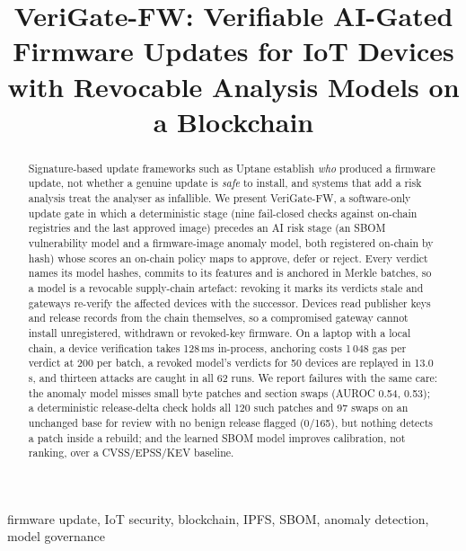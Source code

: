 \documentclass[conference]{IEEEtran}
\newcommand{\sys}{VeriGate-FW}
\begin{document}
\title{\sys: Verifiable AI-Gated Firmware Updates for IoT Devices\\ with Revocable Analysis Models on a Blockchain}

\author{
}

\maketitle

\begin{abstract}
Signature-based update frameworks such as Uptane establish \emph{who} produced a firmware update,
not whether a genuine update is \emph{safe} to install, and systems that add a risk analysis
treat the analyser as infallible. We present \sys{}, a software-only update gate in which a
deterministic stage (nine fail-closed checks against on-chain registries and the last approved
image) precedes an AI risk stage (an SBOM vulnerability model and a firmware-image anomaly model,
both registered on-chain by hash) whose scores an on-chain policy maps to approve, defer or
reject. Every verdict names its model hashes, commits to its features and is anchored in Merkle
batches, so a model is a revocable supply-chain artefact: revoking it marks its verdicts stale and
gateways re-verify the affected devices with the successor. Devices read publisher keys and
release records from the chain themselves, so a compromised gateway cannot install unregistered,
withdrawn or revoked-key firmware. On a laptop with a local chain, a device verification takes
128\,ms in-process, anchoring costs 1\,048 gas per verdict at 200 per batch, a revoked model's
verdicts for 50 devices are replayed in 13.0\,s, and thirteen attacks are caught in all 62 runs.
We report failures with the same care: the anomaly model misses small byte patches and section
swaps (AUROC 0.54, 0.53); a deterministic release-delta check holds all 120 such patches and
97 swaps on an unchanged base for review with no benign release flagged (0/165), but nothing
detects a patch inside a rebuild; and the learned SBOM model improves calibration, not ranking,
over a CVSS/EPSS/KEV baseline.
\end{abstract}

\begin{IEEEkeywords}
firmware update, IoT security, blockchain, IPFS, SBOM, anomaly detection, model governance
\end{IEEEkeywords}
\end{document}
